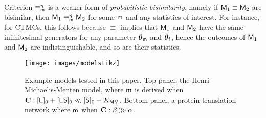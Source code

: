 \documentclass[runningheads,a4paper]{llncs}
\newcommand{\bM}{{\sf{M}}}
\newcommand{\bm}{{\sf{m}}}
\newcommand{\pfpar}{\bth_{\sf{f}}}
\newcommand{\pmpar}{\bth_{\sf{m}}}
\newcommand{\tstat}{\eta} %
\newcommand{\bth}{\boldsymbol{\theta}}
\newcommand{\E}{{\sf{E}}}
\newcommand{\ES}{{{\sf{ES}}} }
\newcommand{\SU}{{{\sf{S}}}}
\newcommand{\PR}{{{\sf{PR}}}}
\newcommand{\COND}{{{\bf  C}}}
\newcommand{\GEI}{{\sf{G}_{\text{\sf in}}}}
\newcommand{\GEA}{{\sf{G}_{\text{\sf act}}}}
\newcommand{\RNA}{{\sf{mRNA}}}
\begin{document}
\begin{remark} Criterion $\equiv_{\bm}^{\tstat}$ is a weaker form of {\em probabilistic bisimilarity},  namely if $\bM_1 \equiv \bM_2$ are  bisimilar, then   $\bM_1 \equiv_{\bm}^{\tstat}  \bM_2$ for some $\bm$ and any statistics of interest.  For instance, for CTMCs, this follows because $\equiv$ implies that $\bM_1$ and $\bM_2$ have the same infinitesimal generators for any parameter $\pmpar$ and $\pfpar$, hence the outcomes of $\bM_1$ and $\bM_2$ are indistinguishable, and  so are their statistics. 
\end{remark}


\begin{figure}[t]
\center \texttt{[image: images/modelstikz]}
\caption{Example models tested in this paper. Top panel: the Henri-Michaelis-Menten model, where $\bm$ is derived when  $\COND:  [\E{}]_0 + [\ES{}]_0 \ll [\SU{}]_0 + K_{\sf MM}$. Bottom panel, a protein translation network where $\bm$
when $\COND: \beta \gg \alpha$.}
\label{fig:ex-models}
\end{figure}
\end{document}
